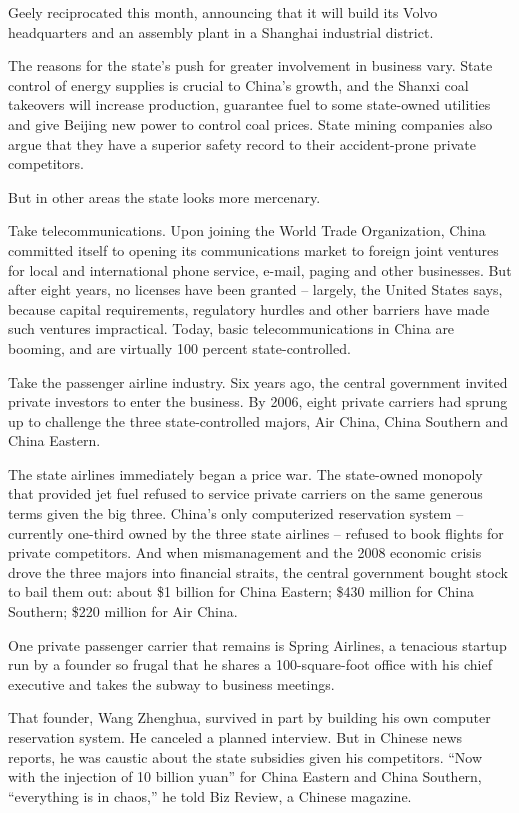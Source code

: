 ﻿\documentclass[12pt]{article}
\begin{document}
Geely reciprocated this month, announcing that it will build its Volvo headquarters and an assembly
plant in a Shanghai industrial district.

The reasons for the state's push for greater involvement in business vary. State control of energy
supplies is crucial to China's growth, and the Shanxi coal takeovers will increase production,
guarantee fuel to some state-owned utilities and give Beijing new power to control coal prices.
State mining companies also argue that they have a superior safety record to their accident-prone
private competitors.

But in other areas the state looks more mercenary.

Take telecommunications. Upon joining the World Trade Organization, China committed itself to
opening its communications market to foreign joint ventures for local and international phone
service, e-mail, paging and other businesses. But after eight years, no licenses have been granted
-- largely, the United States says, because capital requirements, regulatory hurdles and other
barriers have made such ventures impractical. Today, basic telecommunications in China are booming,
and are virtually 100 percent state-controlled.

Take the passenger airline industry. Six years ago, the central government invited private investors
to enter the business. By 2006, eight private carriers had sprung up to challenge the three
state-controlled majors, Air China, China Southern and China Eastern.

The state airlines immediately began a price war. The state-owned monopoly that provided jet fuel
refused to service private carriers on the same generous terms given the big three. China's only
computerized reservation system -- currently one-third owned by the three state airlines -- refused
to book flights for private competitors. And when mismanagement and the 2008 economic crisis drove
the three majors into financial straits, the central government bought stock to bail them out: about
\$1 billion for China Eastern; \$430 million for China Southern; \$220 million for Air China.

One private passenger carrier that remains is Spring Airlines, a tenacious startup run by a founder
so frugal that he shares a 100-square-foot office with his chief executive and takes the subway to
business meetings.

That founder, Wang Zhenghua, survived in part by building his own computer reservation system. He
canceled a planned interview. But in Chinese news reports, he was caustic about the state subsidies
given his competitors. ``Now with the injection of 10 billion yuan'' for China Eastern and China
Southern, ``everything is in chaos,'' he told Biz Review, a Chinese magazine.
\end{document}
